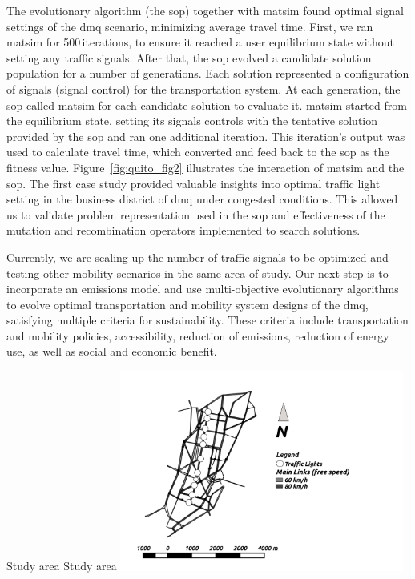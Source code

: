 The evolutionary algorithm (the \gls{sop}) together with \gls{matsim} found optimal signal settings of the \gls{dmq} scenario, minimizing average travel time. First, we ran \gls{matsim} for 500\,iterations, to ensure it reached a user equilibrium state without setting any traffic signals. After that, the \gls{sop} evolved a candidate solution population for a number of generations. Each solution represented a configuration of signals (signal control) for the transportation system. At each generation, the \gls{sop} called \gls{matsim} for each candidate solution to evaluate it. \gls{matsim} started from the equilibrium state, setting its signals controls with the tentative solution provided by the \gls{sop} and ran one additional iteration. This iteration's output was used to calculate travel time, which converted and feed back to the \gls{sop} as the fitness value.
Figure~\ref{fig:quito_fig2} illustrates the interaction of \gls{matsim} and the \gls{sop}. The first case study \citep[][]{ArmasEtAl_SEAL_2014} provided valuable insights into optimal traffic light setting in the business district of \gls{dmq} under congested conditions. This allowed us to validate problem representation used in the \gls{sop} and effectiveness of the mutation and recombination operators implemented to search solutions. 

Currently, we are scaling up the number of traffic signals to be optimized and testing other mobility scenarios in the same area of study. Our next step is to incorporate an emissions model and use multi-objective evolutionary algorithms \citep[][]{AguireEtAl_EMO_2013} to evolve optimal transportation and mobility system designs of the \gls{dmq}, satisfying multiple criteria for sustainability. These criteria include transportation and mobility policies, accessibility, reduction of emissions, reduction of energy use, as well as social and economic benefit.

\createfigure%
{Study area}%
{Study area}%
{\label{fig:quito_fig1}}%
{\includegraphics[width=0.7\textwidth, angle=0]{./using/figures/qfig1.png}}%
{}

